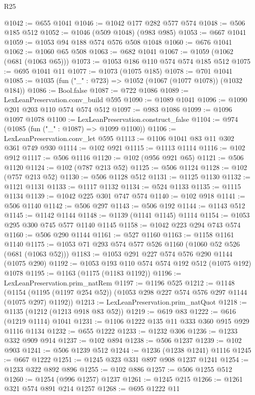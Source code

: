 \begin{lexlean}{R25}
\begin{coremodule}
@1042 := @655 @1041
@1046 := @1042 @177 @282 @577 @574
@1048 := @506 @185 @512
@1052 := @1046 (@509 @1048) (@983 @985)
@1053 := @667 @1041
@1059 := @1053 @94 @188 @574 @576 @508 @1048
@1060 := @676 @1041
@1062 := @1060 @65 @508
@1063 := @682 @1041
@1067 := @1059 (@1062 (@681 (@1063 @65)))
@1073 := @1053 @186 @110 @574 @574 @185 @512
@1075 := @695 @1041 @11
@1077 := @1073 (@1075 @185)
@1078 := @701 @1041
@1085 := @1035 (fun ("_" : @723) => @1052 (@1067 (@1077 @1078)) (@1032 @184))
@1086 := Bool.false
@1087 := @722 @1086
@1089 := LexLeanPreservation.conv_build @595
@1090 := @1089 @1041
@1096 := @1090 @201 @203 @110 @574 @574 @512
@1097 := @983 @1086
@1099 := @1096 @1097 @1078
@1100 := LexLeanPreservation.construct_false
@1104 := @974 (@1085 (fun ("_" : @1087) => @1099 @1100))
@1106 := LexLeanPreservation.conv_let @595
@1113 := @1106 @1041 @83 @11 @302 @361 @749 @930
@1114 := @102 @921
@1115 := @1113 @1114
@1116 := @102 @912
@1117 := @506 @1116
@1120 := @102 (@956 @921 @65)
@1121 := @506 @1120
@1124 := @102 (@787 @213 @52)
@1125 := @506 @1124
@1128 := @102 (@757 @213 @52)
@1130 := @506 @1128 @512
@1131 := @1125 @1130
@1132 := @1121 @1131
@1133 := @1117 @1132
@1134 := @524 @1133
@1135 := @1115 @1134
@1139 := @1042 @225 @301 @747 @574
@1140 := @102 @918
@1141 := @506 @1140
@1142 := @506 @297
@1143 := @506 @192
@1144 := @1143 @512
@1145 := @1142 @1144
@1148 := @1139 (@1141 @1145) @1114
@1154 := @1053 @295 @300 @745 @577 @1140 @1145
@1158 := @1042 @223 @294 @743 @574
@1160 := @506 @290 @1144
@1161 := @527 @1160
@1163 := @1158 @1161 @1140
@1175 := @1053 @71 @293 @574 @577 @526 @1160 (@1060 @52 @526 (@681 (@1063 @52)))
@1183 := @1053 @291 @227 @574 @576 @290 @1144 (@1075 @290)
@1192 := @1053 @193 @110 @574 @574 @192 @512 (@1075 @192) @1078
@1195 := @1163 (@1175 (@1183 @1192))
@1196 := LexLeanPreservation.prim_natRem
@1197 := @1196 @525
@1212 := @1148
    (@1154 (@1195 (@1197 @254 @52)) (@1053 @298 @227 @574 @576 @297 @1144 (@1075 @297) @1192))
@1213 := LexLeanPreservation.prim_natQuot
@1218 := @1135 (@1212 (@1213 @918 @83 @52))
@1219 := @619 @83
@1222 := @616 (@1219 @1114) @1041
@1231 := @1106 @1222 @135 @11 @333 @360 @915 @929 @1116 @1134
@1232 := @655 @1222
@1233 := @1232 @306
@1236 := @1233 @332 @909 @914
@1237 := @102 @894
@1238 := @506 @1237
@1239 := @102 @903
@1241 := @506 @1239 @512
@1244 := @1236 (@1238 @1241) @1116
@1245 := @667 @1222
@1251 := @1245 @323 @331 @897 @908 @1237 @1241
@1254 := @1233 @322 @892 @896
@1255 := @102 @886
@1257 := @506 @1255 @512
@1260 := @1254 (@996 @1257) @1237
@1261 := @1245 @215
@1266 := @1261 @321 @574 @891 @214 @1257
@1268 := @695 @1222 @11

\end{coremodule}
\end{lexlean}
